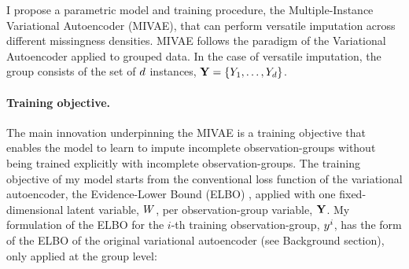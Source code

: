 \documentclass[../thesis.tex]{subfiles}
\begin{document}
I propose a parametric model and training procedure, the Multiple-Instance Variational Autoencoder (MIVAE), that can perform versatile imputation across different missingness densities. MIVAE follows the paradigm of the Variational Autoencoder \citep{sohnLearningStructuredOutput2015} applied to grouped data. In the case of versatile imputation, the group consists of the set of $d$ instances, $\mygroup{\myrv{y}} = \left\{ \myrv{y}_1, \dots, \myrv{y}_{\mycnt{d}} \right\}$.

\paragraph{Training objective.} The main innovation underpinning the MIVAE is a training objective that enables the model to learn to impute incomplete observation-groups without being trained explicitly with incomplete observation-groups. The training objective of my model starts from the conventional loss function of the variational autoencoder, the Evidence-Lower Bound (ELBO) \citep{kingma2013auto,rezende2014stochastic}, applied with one fixed-dimensional latent variable, $\myrv{w}$, per observation-group variable, $\mygroup{\myrv{y}}$.
My formulation of the ELBO for the $i$-th training observation-group, $y^i$, has the form of the ELBO of the original variational autoencoder (see Background section), only applied at the group level: 
\end{document}
